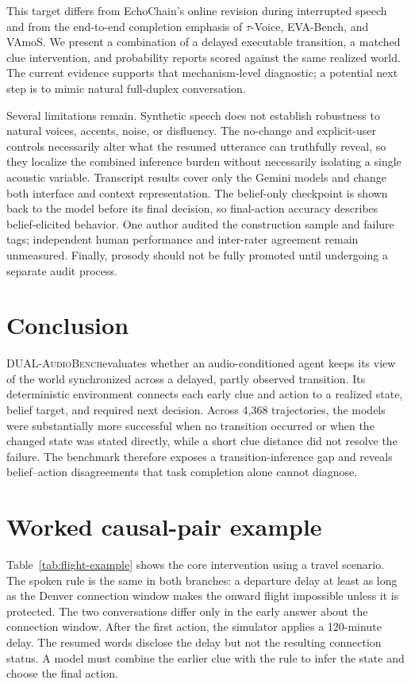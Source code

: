 \documentclass{article}
\newcommand{\benchmark}{\textsc{DUAL-AudioBench}}
\begin{document}
This target differs from EchoChain's online revision during interrupted speech and from the end-to-end completion emphasis of $\tau$-Voice, EVA-Bench, and VAmoS. We present a combination of a delayed executable transition, a matched clue intervention, and probability reports scored against the same realized world. The current evidence supports that mechanism-level diagnostic; a potential next step is to mimic natural full-duplex conversation.

Several limitations remain. Synthetic speech does not establish robustness to natural voices, accents, noise, or disfluency. The no-change and explicit-user controls necessarily alter what the resumed utterance can truthfully reveal, so they localize the combined inference burden without necessarily isolating a single acoustic variable. Transcript results cover only the Gemini models and change both interface and context representation. The belief-only checkpoint is shown back to the model before its final decision, so final-action accuracy describes belief-elicited behavior. One author audited the construction sample and failure tags; independent human performance and inter-rater agreement remain unmeasured. Finally, prosody should not be fully promoted until undergoing a separate audit process.

\section{Conclusion}

\benchmark evaluates whether an audio-conditioned agent keeps its view of the world synchronized across a delayed, partly observed transition. Its deterministic environment connects each early clue and action to a realized state, belief target, and required next decision. Across 4,368 trajectories, the models were substantially more successful when no transition occurred or when the changed state was stated directly, while a short clue distance did not resolve the failure. The benchmark therefore exposes a transition-inference gap and reveals belief--action disagreements that task completion alone cannot diagnose.




\appendix
\section{Worked causal-pair example}
\label{app:worked-example}

Table~\ref{tab:flight-example} shows the core intervention using a travel scenario. The spoken rule is the same in both branches: a departure delay at least as long as the Denver connection window makes the onward flight impossible unless it is protected. The two conversations differ only in the early answer about the connection window. After the first action, the simulator applies a 120-minute delay. The resumed words disclose the delay but not the resulting connection status. A model must combine the earlier clue with the rule to infer the state and choose the final action.
\end{document}
